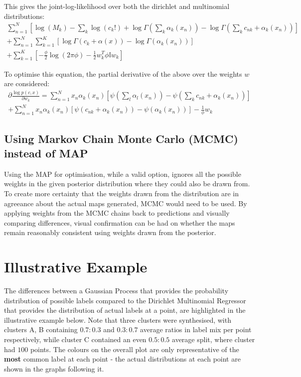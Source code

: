 This gives the joint-log-likelihood over both the dirichlet and multinomial distributions:
\begin{multline}
    \sum^N_{n=1} [\log(M_k) - \sum_k \log(c_k!) + \log \Gamma(\sum_k \alpha_k(x_n)) - \log \Gamma(\sum_k c_{nk} + \alpha_k(x_n))] \\
    + \sum^N_{n=1} \sum^K_{k=1} [\log \Gamma(c_k + \alpha(x)) - \log \Gamma(\alpha_k(x_n))] \\
    + \sum^K_{k=1} [-\frac{\phi}{2} \log(2\pi \phi) - \frac{1}{2}w_k^T \phi \mathbb{I} w_k]
\end{multline}

To optimise this equation, the partial derivative of the above over the weights $w$ are considered:
\begin{multline}
    \partial \frac{\log p(c, x)}{\partial w_k} = \sum_{n=1}^N x_n \alpha_k (x_n) [\psi(\sum_l \alpha_l(x_n)) - \psi(\sum_k c_{nk} + \alpha_k(x_n))] \\
    + \sum^N_{n=1} x_n \alpha_k (x_n) [\psi (c_{nk} + \alpha_k(x_n)) - \psi(\alpha_k(x_n))] - \frac{1}{\phi} w_k
\end{multline}


\subsection{Using Markov Chain Monte Carlo (MCMC) instead of MAP}

Using the MAP for optimisation, while a valid option, ignores all the possible weights in the given posterior distribution where they could also be drawn from. To create more certainty that the weights drawn from the distribution are in agreeance about the actual maps generated, MCMC would need to be used. By applying weights from the MCMC chains back to predictions and visually comparing differences, visual confirmation can be had on whether the maps remain reasonably consistent using weights drawn from the posterior.

\section{Illustrative Example}

The differences between a Gaussian Process that provides the probability distribution of possible labels compared to the Dirichlet Multinomial Regressor that provides the distribution of actual labels at a point, are highlighted in the illustrative example below. Note that three clusters were synthesised, with clusters A, B containing $0.7:0.3$ and $0.3:0.7$ average ratios in label mix per point respectively, while cluster C contained an even $0.5:0.5$ average split, where cluster had $100$ points. The colours on the overall plot are only representative of the \textbf{most} common label at each point - the actual distributions at each point are shown in the graphs following it.

